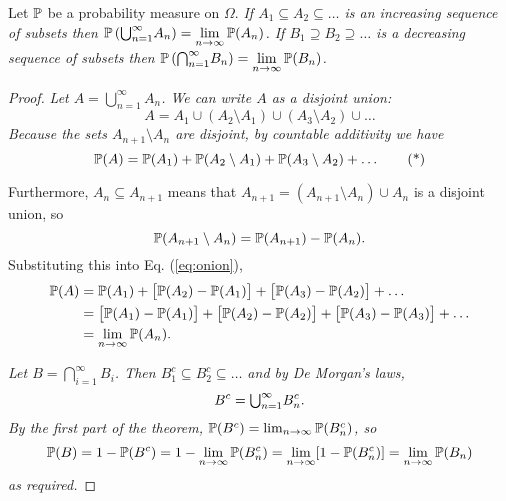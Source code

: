 
\begin{theorem}\label{thm:cont_pms}
Let $\mathbb{P}$ be a probability measure on $\Omega$.
\ben
\it If $A_1\subseteq A_2\subseteq \ldots$ is an increasing sequence of subsets then 
$\displaystyle\mathbb{P}\left({\textstyle\bigcup}_{n=1}^{\infty} A_n\right) = \lim_{n\to\infty}\mathbb{P}(A_n)$.
\it If $B_1\supseteq B_2\supseteq \ldots$ is a decreasing sequence of subsets then
$\displaystyle\mathbb{P}\left({\textstyle\bigcap}_{n=1}^{\infty} B_n\right) = \lim_{n\to\infty}\mathbb{P}(B_n)$.
\een
\end{theorem}

\begin{proof}
\ben
\it Let $A=\bigcup_{n=1}^{\infty} A_n$. We can write $A$ as a disjoint union:
\[
A = A_1 \cup (A_2\setminus A_1) \cup (A_3\setminus A_2) \cup \ldots
\]
Because the sets $A_{n+1}\setminus A_n$ are disjoint, by countable additivity we have
\begin{equation}\label{eq:onion}
\mathbb{P}(A) = \mathbb{P}(A_1) + \mathbb{P}(A_2\setminus A_1) + \mathbb{P}(A_3\setminus A_2) + \ldots \tag{*}
\end{equation}

Furthermore, $A_n\subseteq A_{n+1}$ means that $A_{n+1}=(A_{n+1}\setminus A_n)\cup A_n$ is a disjoint union, so
\[
\mathbb{P}(A_{n+1}\setminus A_n)=\mathbb{P}(A_{n+1})-\mathbb{P}(A_n).
\]
Substituting this into Eq. (\ref{eq:onion}), 
\begin{align*}
\mathbb{P}(A) 
	& = \mathbb{P}(A_1) + \big[\mathbb{P}(A_2) - \mathbb{P}(A_1)\big] + \big[\mathbb{P}(A_3) - \mathbb{P}(A_2)\big] + \ldots \\
	& = \big[\mathbb{P}(A_1) - \mathbb{P}(A_1)\big] + \big[\mathbb{P}(A_2) - \mathbb{P}(A_2)\big] + \big[\mathbb{P}(A_3) - \mathbb{P}(A_3)\big] + \ldots \\
	& = \lim_{n\to\infty} \mathbb{P}(A_n).
\end{align*}

\it Let $B=\bigcap_{i=1}^{\infty} B_i$. Then $B_1^c\subseteq B_2^c\subseteq\ldots$ and by De Morgan's laws,
\[
B^c = {\textstyle\bigcup}_{n=1}^{\infty} B_n^c. 
\]
By the first part of the theorem, $\mathbb{P}(B^c) = \lim_{n\to\infty}\mathbb{P}(B_n^c)$, so
\[
\mathbb{P}(B) 
	= 1 - \mathbb{P}(B^c)
	= 1 - \lim_{n\to\infty} \mathbb{P}(B_n^c) 
	= \lim_{n\to\infty} [1-\mathbb{P}(B_n^c)] 
	= \lim_{n\to\infty} \mathbb{P}(B_n)
\]
as required.
\een
\end{proof}

